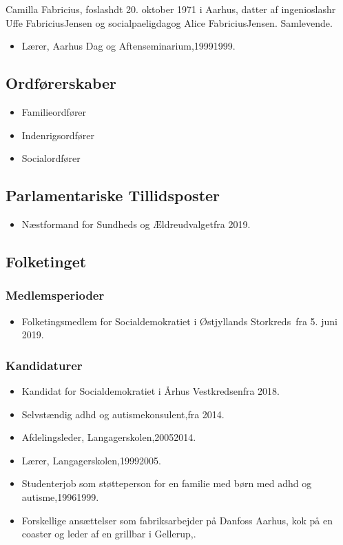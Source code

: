 \documentclass[11pt, a4paper]{awesome-cv}
\begin{document}
\makecvheader[R]
\makelettertitle
\begin{cvletter}
Camilla Fabricius, foslashdt 20. oktober 1971 i Aarhus, datter af ingenioslashr Uffe FabriciusJensen og socialpaeligdagog Alice FabriciusJensen. Samlevende.

\begin{itemize}
\item Lærer, Aarhus Dag og Aftenseminarium,19991999.
\end{itemize}
\subsection*{Ordførerskaber}
\begin{itemize}
\item Familieordfører
\item Indenrigsordfører
\item Socialordfører
\end{itemize}
\subsection*{Parlamentariske Tillidsposter}
\begin{itemize}
\item Næstformand for Sundheds og Ældreudvalgetfra 2019.
\end{itemize}
\subsection*{Folketinget}
\subsubsection*{Medlemsperioder}
\begin{itemize}
\item Folketingsmedlem for Socialdemokratiet i Østjyllands Storkreds fra 5. juni 2019.
\end{itemize}
\subsubsection*{Kandidaturer}
\begin{itemize}
\item Kandidat for Socialdemokratiet i Århus Vestkredsenfra 2018.
\end{itemize}
\begin{itemize}
\item Selvstændig adhd og autismekonsulent,fra 2014.
\item Afdelingsleder, Langagerskolen,20052014.
\item Lærer, Langagerskolen,19992005.
\item Studenterjob som støtteperson for en familie med børn med adhd og autisme,19961999.
\item Forskellige ansættelser som fabriksarbejder på Danfoss Aarhus, kok på en coaster og leder af en grillbar i Gellerup,.
\end{itemize}
\end{cvletter}
\end{document}

